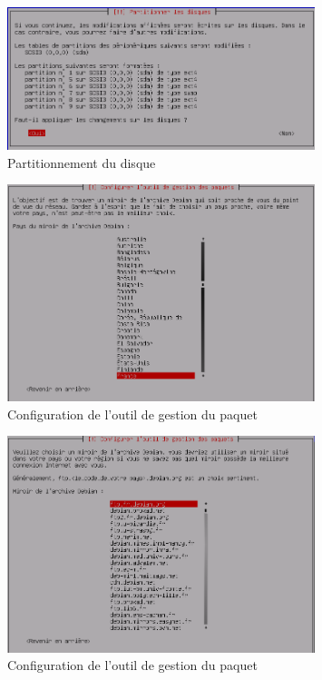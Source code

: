 \documentclass[11pt,a4paper,titlepage, oneside]{article}
\begin{document}
	\newpage
                \begin{figure}[h]
                        \centering
                        \includegraphics[width=0.8\textwidth,natwidth=610,natheight=642]{images/debian16.png}
                        \caption{Partitionnement du disque}
                \end{figure}

	\newpage
                \begin{figure}[h]
                        \centering
                        \includegraphics[width=0.8\textwidth,natwidth=610,natheight=642]{images/debian17.png}
                        \caption{Configuration de l'outil de gestion du paquet}
                \end{figure}

	\newpage
                \begin{figure}[h]
                        \centering
                        \includegraphics[width=0.8\textwidth,natwidth=610,natheight=642]{images/debian18.png}
                        \caption{Configuration de l'outil de gestion du paquet}
                \end{figure}
\end{document}
